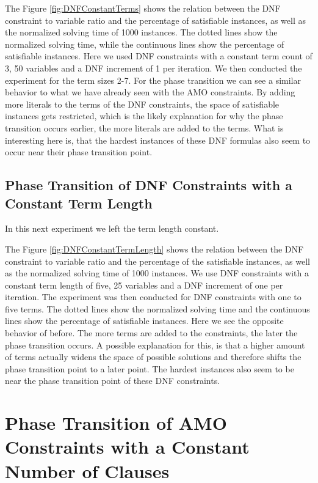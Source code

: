 


The Figure \ref{fig:DNFConstantTerms} shows the relation between the DNF constraint to variable ratio and the percentage of satisfiable instances, as well as the normalized solving time of 1000 instances. The dotted lines show the normalized solving time, while the continuous lines show the percentage of satisfiable instances. Here we used DNF constraints with a constant term count of 3, 50 variables and a DNF increment of 1 per iteration. We then conducted the experiment for the term sizes 2-7. For the phase transition we can see a similar behavior to what we have already seen with the AMO constraints. By adding more literals to the terms of the DNF constraints, the space of satisfiable instances gets restricted, which is the likely explanation for why the phase transition occurs earlier, the more literals are added to the terms. What is interesting here is, that the hardest instances of these DNF formulas also seem to occur near their phase transition point.

\subsection{Phase Transition of DNF Constraints with a Constant Term Length}

In this next experiment we left the term length constant.

	

The Figure \ref{fig:DNFConstantTermLength} shows the relation between the DNF constraint to variable ratio and the percentage of the satisfiable instances, as well as the normalized solving time of 1000 instances. We use DNF constraints with a constant term length of five, 25 variables and a DNF increment of one per iteration. The experiment was then conducted for DNF constraints with one to five terms. The dotted lines show the normalized solving time and the continuous lines show the percentage of satisfiable instances. Here we see the opposite behavior of before. The more terms are added to the constraints, the later the phase transition occurs. A possible explanation for this, is that a higher amount of terms actually widens the space of possible solutions and therefore shifts the phase transition point to a later point. The hardest instances also seem to be near the phase transition point of these DNF constraints.

\section{Phase Transition of AMO Constraints with a Constant Number of Clauses}

